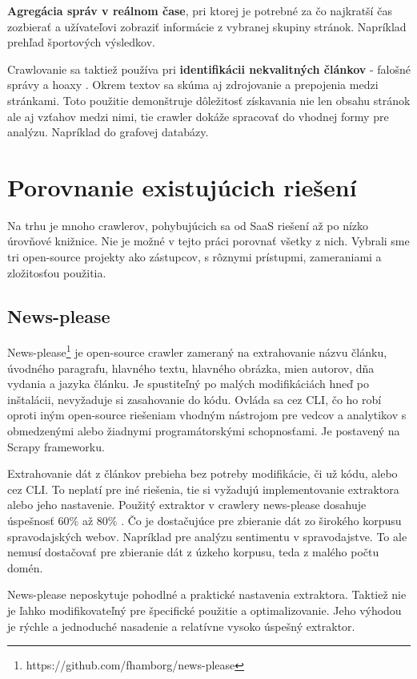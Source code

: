 \textbf{Agregácia správ v reálnom čase}, pri ktorej je potrebné za čo najkratší čas zozbierať a užívateľovi zobraziť informácie z vybranej skupiny stránok. Napríklad prehľad športových výsledkov. 

Crawlovanie sa taktiež používa pri \textbf{identifikácii nekvalitných článkov} - falošné správy a hoaxy \cite{fakeNews}. Okrem textov sa skúma aj zdrojovanie a prepojenia medzi stránkami. Toto použitie demonštruje dôležitosť získavania nie len obsahu stránok ale aj vzťahov medzi nimi, tie crawler dokáže spracovať do vhodnej formy pre analýzu. Napríklad do grafovej databázy. 



\section{Porovnanie existujúcich riešení} 
Na trhu je mnoho crawlerov, pohybujúcich sa od SaaS riešení až po nízko úrovňové knižnice. Nie je možné v tejto práci porovnať všetky z nich. Vybrali sme tri open-source projekty ako zástupcov, s rôznymi prístupmi, zameraniami a zložitosťou použitia.

\subsection{News-please}
News-please\footnote{https://github.com/fhamborg/news-please} je open-source crawler zameraný na extrahovanie názvu článku, úvodného paragrafu, hlavného textu, hlavného obrázka, mien autorov, dňa vydania a jazyka článku. Je spustiteľný po malých modifikáciách hneď po inštalácii, nevyžaduje si zasahovanie do kódu. Ovláda sa cez CLI, čo ho robí oproti iným open-source riešeniam vhodným nástrojom pre vedcov a analytikov s obmedzenými alebo žiadnymi programátorskými schopnosťami. Je postavený na Scrapy frameworku. 

Extrahovanie dát z článkov prebieha bez potreby modifikácie, či už kódu, alebo cez CLI. To neplatí pre iné riešenia, tie si vyžadujú implementovanie extraktora alebo jeho nastavenie. Použitý extraktor v crawlery news-please dosahuje úspešnosť 60\% až 80\% \cite{newsPlease}. Čo je dostačujúce pre zbieranie dát zo širokého korpusu spravodajských webov. Napríklad pre analýzu sentimentu v spravodajstve. To ale nemusí dostačovať pre zbieranie dát z úzkeho korpusu, teda z malého počtu domén. 

News-please neposkytuje pohodlné a praktické nastavenia extraktora. Taktiež nie je ľahko modifikovateľný pre špecifické použitie a optimalizovanie. Jeho výhodou je rýchle a jednoduché nasadenie a relatívne vysoko úspešný extraktor. 

